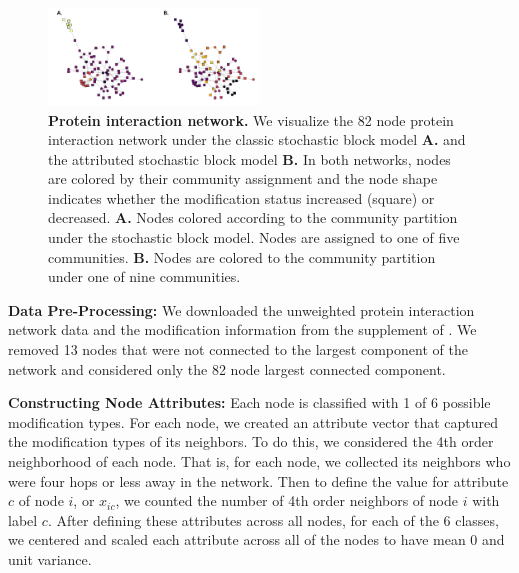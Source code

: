 \documentclass[10pt,journal,compsoc]{IEEEtran}
\begin{document}
\begin{figure}[h!]
\begin{center}
\includegraphics[width=0.5\textwidth]{ProteinNet_Dec12.pdf}
\caption{{\bf Protein interaction network.} We visualize the 82 node protein interaction network under the classic stochastic block model {\bf A.} and the attributed stochastic block model {\bf B.} In both networks, nodes are colored by their community assignment and the node shape indicates whether the modification status increased (square) or decreased. {\bf A.} Nodes colored according to the community partition under the stochastic block model. Nodes are assigned to one of five communities. {\bf B.} Nodes are colored to the community partition under one of nine communities.}
\label{Fig7}
\end{center}
\end{figure}

{\bf Data Pre-Processing: } We downloaded the unweighted protein interaction network data and the modification information from the supplement of \cite{bonacci}. We removed 13 nodes that were not connected to the largest component of the network and considered only the 82 node largest connected component.

{\bf Constructing Node Attributes:}
Each node is classified with 1 of 6 possible modification types. For each node, we created an attribute vector that captured the modification types of its neighbors. To do this, we considered the 4th order neighborhood of each node. That is, for each node, we collected its neighbors who were four hops or less away in the network. Then to define the value for attribute $c$ of node $i$, or $x_{ic}$, we counted the number of 4th order neighbors of node $i$ with label $c$. After defining these attributes across all nodes, for each of the 6 classes, we centered and scaled each attribute across all of the nodes to have mean 0 and unit variance. 
\end{document}
